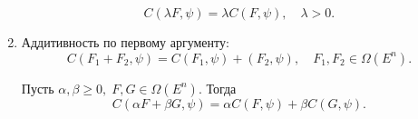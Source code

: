 \begin{enumerate}
\begin{equation*}
        C(\lambda F, \psi) = \lambda C(F, \psi), \quad \lambda > 0.
    \end{equation*}
    \item Аддитивность по первому аргументу: \begin{equation*}
        C(F_1 + F_2, \psi) = C(F_1, \psi) + (F_2, \psi), \quad F_1, F_2 \in \Omega(E^n).
    \end{equation*}
    \begin{rmrk}
        Пусть $\alpha, \beta \geqslant 0, \; F, G \in \Omega(E^n)$.
        Тогда \begin{equation*}
            C(\alpha F + \beta G, \psi) = \alpha C(F, \psi) + \beta C(G, \psi).
        \end{equation*}
    \end{rmrk}
\end{enumerate}

